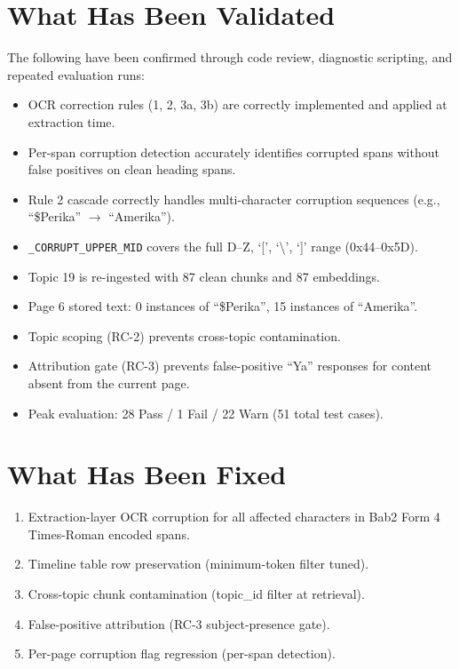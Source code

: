 \documentclass[12pt, a4paper]{report}
\newcommand{\codeinline}[1]{\texttt{#1}}
\begin{document}
\section{What Has Been Validated}

The following have been confirmed through code review, diagnostic scripting,
and repeated evaluation runs:

\begin{itemize}[noitemsep]
  \item OCR correction rules (1, 2, 3a, 3b) are correctly implemented and
        applied at extraction time.
  \item Per-span corruption detection accurately identifies corrupted spans
        without false positives on clean heading spans.
  \item Rule 2 cascade correctly handles multi-character corruption sequences
        (e.g., ``\$Perika'' $\to$ ``Amerika'').
  \item \codeinline{\_CORRUPT\_UPPER\_MID} covers the full D--Z, `[',
        `\textbackslash', `]' range (0x44--0x5D).
  \item Topic 19 is re-ingested with 87 clean chunks and 87 embeddings.
  \item Page 6 stored text: 0 instances of ``\$Perika'', 15 instances of
        ``Amerika''.
  \item Topic scoping (RC-2) prevents cross-topic contamination.
  \item Attribution gate (RC-3) prevents false-positive ``Ya'' responses
        for content absent from the current page.
  \item Peak evaluation: 28 Pass / 1 Fail / 22 Warn (51 total test cases).
\end{itemize}

\section{What Has Been Fixed}

\begin{enumerate}[noitemsep]
  \item Extraction-layer OCR corruption for all affected characters in Bab2
        Form 4 Times-Roman encoded spans.
  \item Timeline table row preservation (minimum-token filter tuned).
  \item Cross-topic chunk contamination (topic\_id filter at retrieval).
  \item False-positive attribution (RC-3 subject-presence gate).
  \item Per-page corruption flag regression (per-span detection).
\end{enumerate}
\end{document}
